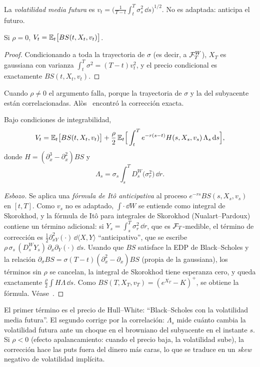 \begin{definicion}
La \emph{volatilidad media futura} es $v_t=\Big(\frac1{T-t}\int_t^T\sigma_s^2\,\dd s\Big)^{1/2}$. No es adaptada:
anticipa el futuro.
\end{definicion}

\begin{teorema}
Si $\rho=0$, $V_t=\mathbb{E}_t\big[BS(t,X_t,v_t)\big]$.
\end{teorema}

\begin{proof}
Condicionando a toda la trayectoria de $\sigma$ (es decir, a $\mathcal{F}^W_T$), $X_T$ es gaussiana
con varianza $\int_t^T\sigma^2=(T-t)v_t^2$, y el precio condicional es exactamente $BS(t,X_t,v_t)$.
\end{proof}

Cuando $\rho\ne0$ el argumento falla, porque la trayectoria de $\sigma$ y la del subyacente están
correlacionadas. Alòs~\cite{Alos06} encontró la corrección exacta.

\begin{teorema}[Alòs, 2006]\label{teo:alos}
Bajo condiciones de integrabilidad,
\[
  V_t=\mathbb{E}_t\big[BS(t,X_t,v_t)\big]+\frac\rho2\,\mathbb{E}_t\Big[\int_t^Te^{-r(s-t)}H(s,X_s,v_s)\,\Lambda_s\,\mathrm{d} s\Big],
\]
donde $H=(\partial_x^3-\partial_x^2)BS$ y
\[
  \Lambda_s=\sigma_s\int_s^TD^W_s\big(\sigma_r^2\big)\,\dd r.
\]
\end{teorema}

\begin{proof}[Esbozo]
Se aplica una \emph{fórmula de Itô anticipativa} al proceso $e^{-rs}BS(s,X_s,v_s)$ en $[t,T]$. Como
$v_s$ no es adaptado, $\int\cdot\,\dd W$ se entiende como integral de Skorokhod, y la fórmula de Itô para
integrales de Skorokhod (Nualart--Pardoux) contiene un término adicional: si $Y_s=\int_s^T\sigma_r^2\,\dd r$,
que es $\mathcal{F}_T$-medible, el término de corrección es $\frac12\partial^2_{xY}(\cdot)\,\dd\langle X,Y\rangle$ ``anticipativo'', que se escribe
$\rho\,\sigma_s\,(D^W_sY_s)\,\partial_x\partial_Y(\cdot)\,\dd s$. Usando que $BS$ satisface la EDP de Black--Scholes y la relación
$\partial_\sigma BS=\sigma(T-t)(\partial_x^2-\partial_x)BS$ (propia de la gaussiana), los términos sin $\rho$ se cancelan, la integral
de Skorokhod tiene esperanza cero, y queda exactamente $\frac\rho2\int H\Lambda\,\dd s$. Como $BS(T,X_T,v_T)=
(e^{X_T}-K)^+$, se obtiene la fórmula. Véase~\cite{Alos06,AlosGarciaLorite21}.
\end{proof}

\begin{intuicion}
El primer término es el precio de Hull--White: ``Black--Scholes con la volatilidad media
futura''. El segundo corrige por la correlación: $\Lambda_s$ mide cuánto cambia la volatilidad
futura ante un choque en el browniano del subyacente en el instante $s$. Si $\rho<0$ (efecto
apalancamiento: cuando el precio baja, la volatilidad sube), la corrección hace las puts
fuera del dinero más caras, lo que se traduce en un \emph{skew} negativo de volatilidad implícita.
\end{intuicion}

